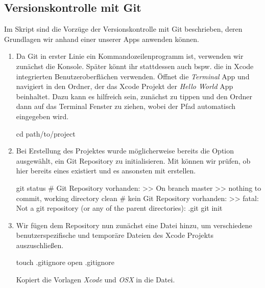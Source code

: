 \documentclass[parskip=half, final]{scrreprt}
\begin{document}
\begin{lecture} %


\chapter{Versionskontrolle mit Git}

Im Skript sind die Vorzüge der Versionskontrolle mit Git beschrieben, deren Grundlagen wir anhand einer unserer Apps anwenden können.


\begin{enumerate}

\item Da Git in erster Linie ein Kommandozeilenprogramm ist, verwenden wir zunächst die Konsole. Später könnt ihr stattdessen auch bspw. die in Xcode integrierten Benutzeroberflächen verwenden. Öffnet die \emph{Terminal} App und navigiert in den Ordner, der das Xcode Projekt der \emph{Hello World} App beinhaltet. Dazu kann es hilfreich sein, zunächst  zu tippen und den Ordner dann auf das Terminal Fenster zu ziehen, wobei der Pfad automatisch eingegeben wird.

\begin{shcode}
cd path/to/project
\end{shcode}

\item Bei Erstellung des Projektes wurde möglicherweise bereits die Option ausgewählt, ein Git Repository zu initialisieren. Mit  können wir prüfen, ob hier bereits eines existiert und es ansonsten mit  erstellen.

\begin{shcode}
git status
# Git Repository vorhanden:
>> On branch master
>> nothing to commit, working directory clean
# kein Git Repository vorhanden:
>> fatal: Not a git repository (or any of the parent directories): .git
git init
\end{shcode}

\item Wir fügen dem Repository nun zunächst eine  Datei hinzu, um verschiedene benutzerspezifische und temporäre Dateien des Xcode Projekts auszuschließen.

\begin{shcode}
touch .gitignore
open .gitignore
\end{shcode}

Kopiert die Vorlagen \emph{Xcode}  und \emph{OSX}  in die  Datei.


\end{enumerate}
\end{lecture}
\end{document}
